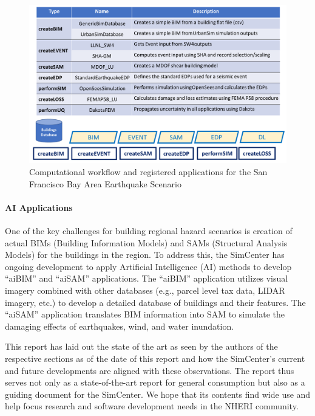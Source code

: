 \begin{figure}[htb]
    \centering
    \includegraphics[width=1.0\textwidth, angle = 0]{Figures/CompWorkflow.png}
    \caption{Computational workflow and registered applications for the San Francisco Bay Area Earthquake Scenario}
    \label{fig:intro_CompWorkflow}
\end{figure}

\paragraph{AI Applications} One of the key challenges for building regional hazard scenarios is creation of actual BIMs (Building Information Models) and SAMs (Structural Analysis Models) for the buildings in the region. To address this, the SimCenter has ongoing development to apply Artificial Intelligence (AI) methods to develop “aiBIM” and “aiSAM” applications. The “aiBIM” application utilizes visual imagery combined with other databases (e.g., parcel level tax data, LIDAR imagery, etc.) to develop a detailed database of buildings and their features. The “aiSAM” application translates BIM information into SAM to simulate the damaging effects of earthquakes, wind, and water inundation.

\noindent This report has laid out the state of the art as seen by the authors of the respective sections as of the date of this report and how the SimCenter's current and future developments are aligned with these observations. The report thus serves not only as a state-of-the-art report for general consumption but also as a guiding document for the SimCenter. We hope that its contents find wide use and help focus research and software development needs in the NHERI community.